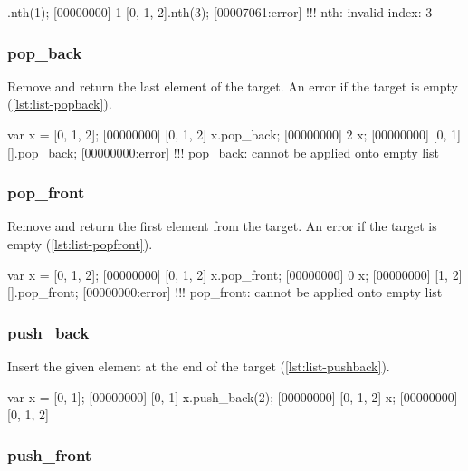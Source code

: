 \begin{urbiscript}[caption=List.nth, label=lst:list-nth, float=\floatposh]
[0, 1, 2].nth(1);
[00000000] 1
[0, 1, 2].nth(3);
[00007061:error] !!! nth: invalid index: 3
\end{urbiscript}

\subsubsection{pop\_back}

Remove and return the last element of the target. An error if the
target is empty (\autoref{lst:list-popback}).

\begin{urbiscript}[caption=List.pop\_back, label=lst:list-popback, float=\floatposh]
var x = [0, 1, 2];
[00000000] [0, 1, 2]
x.pop_back;
[00000000] 2
x;
[00000000] [0, 1]
[].pop_back;
[00000000:error] !!! pop_back: cannot be applied onto empty list
\end{urbiscript}

\subsubsection{pop\_front}

Remove and return the first element from the target. An error if the
target is empty (\autoref{lst:list-popfront}).

\begin{urbiscript}[caption=List.pop\_front, label=lst:list-popfront, float=\floatposh]
var x = [0, 1, 2];
[00000000] [0, 1, 2]
x.pop_front;
[00000000] 0
x;
[00000000] [1, 2]
[].pop_front;
[00000000:error] !!! pop_front: cannot be applied onto empty list
\end{urbiscript}

\subsubsection{push\_back}
\label{sec:std-list-pushback}

Insert the given element at the end of the target
(\autoref{lst:list-pushback}).

\begin{urbiscript}[caption=List.push\_back, label=lst:list-pushback, float=\floatposh]
var x = [0, 1];
[00000000] [0, 1]
x.push_back(2);
[00000000] [0, 1, 2]
x;
[00000000] [0, 1, 2]
\end{urbiscript}

\subsubsection{push\_front}

